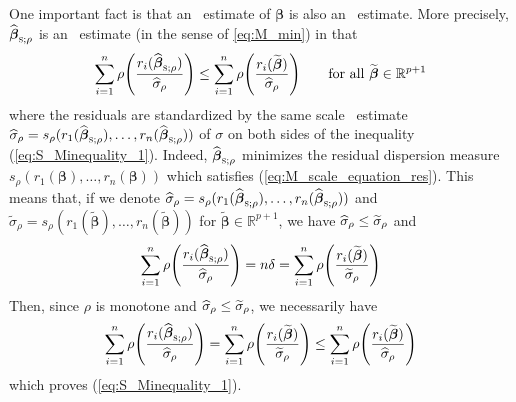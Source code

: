 One important fact is that an ~estimate of $\boldsymbol\beta$ is also an
~estimate. More precisely, $\sthat{\boldsymbol\beta}_{\stsc{S};\rho}$
is an ~estimate (in the sense of \ref{eq:M_min}) in that
%
\begin{equation}\label{eq:S_Minequality_1}
    \sum_{i=1}^{n}\rho\left(\frac{r_i(\sthat{\boldsymbol\beta}_{\stsc{S};\rho})}{\sthat{\sigma}_{\rho}}\right) 
    \leq \sum_{i=1}^{n}\rho\left(\frac{r_i(\widetilde{\boldsymbol\beta})}{\sthat{\sigma}_{\rho}}\right)
    \qquad
    \text{for all $\widetilde{\boldsymbol\beta} \in \mathbb{R}^{p+1}$}
\end{equation}
%
where the residuals are standardized by the same scale ~estimate
$\sthat{\sigma}_{\rho} =
s_{\rho}(r_1(\sthat{\boldsymbol\beta}_{\stsc{S};\rho}),\allowbreak
\dots,\allowbreak r_n(\sthat{\boldsymbol\beta}_{\stsc{S};\rho}))$ of $\sigma$
on both sides of the inequality (\ref{eq:S_Minequality_1}). Indeed,
$\sthat{\boldsymbol\beta}_{\stsc{S};\rho}$ minimizes the residual dispersion
measure $s_{\rho}(r_1(\boldsymbol\beta), \dots, r_n(\boldsymbol\beta))$
which satisfies (\ref{eq:M_scale_equation_res}). This means that, if we denote
$\sthat{\sigma}_{\rho} =
s_{\rho}(r_1(\sthat{\boldsymbol\beta}_{\stsc{S};\rho}), \dots,
r_n(\sthat{\boldsymbol\beta}_{\stsc{S};\rho}))$ and
$\widetilde{\sigma}_{\rho} = s_{\rho}(r_1(\widetilde{\boldsymbol\beta}),
\dots, r_n(\widetilde{\boldsymbol\beta}))$ for $\widetilde{\boldsymbol\beta}
\in \mathbb{R}^{p+1}$, we have $\widehat{\sigma}_{\rho} \leq
\widetilde{\sigma}_{\rho}$ and
\[
    \sum_{i=1}^{n} \rho\left(\frac{r_i(\sthat{\boldsymbol\beta}_{\stsc{S};\rho})}{\sthat{\sigma}_{\rho}}\right) 
    = n\delta
    = \sum_{i=1}^{n}\rho\left(\frac{r_i(\widetilde{\boldsymbol\beta})}{\widetilde{\sigma}_{\rho}}\right)
\]
Then, since $\rho$ is monotone and $\widehat{\sigma}_{\rho} \leq
\widetilde{\sigma}_{\rho}$, we necessarily have
\[
    \sum_{i=1}^{n} \rho\left(\frac{r_i(\sthat{\boldsymbol\beta}_{\stsc{S};\rho})}{\sthat{\sigma}_{\rho}}\right)
    = \sum_{i=1}^{n} \rho\left(\frac{r_i(\widetilde{\boldsymbol\beta})}{\widetilde{\sigma}_{\rho}}\right)
    \leq \sum_{i=1}^{n}\rho\left(\frac{r_i(\widetilde{\boldsymbol\beta})}{\sthat{\sigma}_{\rho}}\right)
\]
which proves (\ref{eq:S_Minequality_1}).

